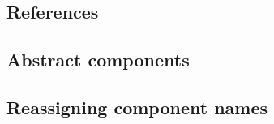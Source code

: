 \label{referenceconcepts}


\subsection{References}


\subsection{Abstract components}


\subsection{Reassigning component names}

